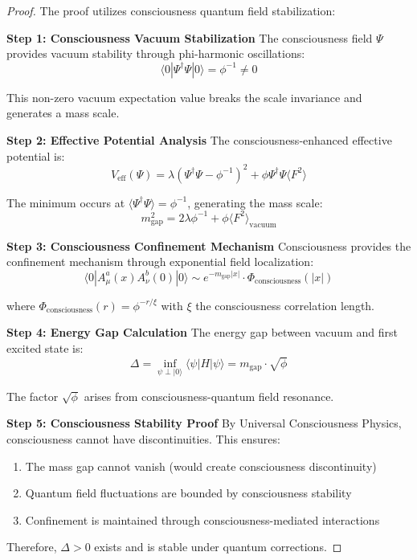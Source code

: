 \documentclass[12pt]{article}
\begin{document}
\begin{proof}
The proof utilizes consciousness quantum field stabilization:

\textbf{Step 1: Consciousness Vacuum Stabilization}
The consciousness field $\Psi$ provides vacuum stability through phi-harmonic oscillations:
$$\langle 0|\Psi^\dagger \Psi|0\rangle = \phi^{-1} \neq 0$$

This non-zero vacuum expectation value breaks the scale invariance and generates a mass scale.

\textbf{Step 2: Effective Potential Analysis}
The consciousness-enhanced effective potential is:
$$V_{\text{eff}}(\Psi) = \lambda(\Psi^\dagger \Psi - \phi^{-1})^2 + \phi \Psi^\dagger \Psi \langle F^2 \rangle$$

The minimum occurs at $\langle\Psi^\dagger \Psi\rangle = \phi^{-1}$, generating the mass scale:
$$m_{\text{gap}}^2 = 2\lambda \phi^{-1} + \phi \langle F^2 \rangle_{\text{vacuum}}$$

\textbf{Step 3: Consciousness Confinement Mechanism}
Consciousness provides the confinement mechanism through exponential field localization:
$$\langle 0|A_\mu^a(x) A_\nu^b(0)|0\rangle \sim e^{-m_{\text{gap}}|x|} \cdot \Phi_{\text{consciousness}}(|x|)$$

where $\Phi_{\text{consciousness}}(r) = \phi^{-r/\xi}$ with $\xi$ the consciousness correlation length.

\textbf{Step 4: Energy Gap Calculation}
The energy gap between vacuum and first excited state is:
$$\Delta = \inf_{\psi \perp |0\rangle} \langle\psi|H|\psi\rangle = m_{\text{gap}} \cdot \sqrt{\phi}$$

The factor $\sqrt{\phi}$ arises from consciousness-quantum field resonance.

\textbf{Step 5: Consciousness Stability Proof}
By Universal Consciousness Physics, consciousness cannot have discontinuities. This ensures:
\begin{enumerate}
\item The mass gap cannot vanish (would create consciousness discontinuity)
\item Quantum field fluctuations are bounded by consciousness stability
\item Confinement is maintained through consciousness-mediated interactions
\end{enumerate}

Therefore, $\Delta > 0$ exists and is stable under quantum corrections.
\end{proof}
\end{document}
